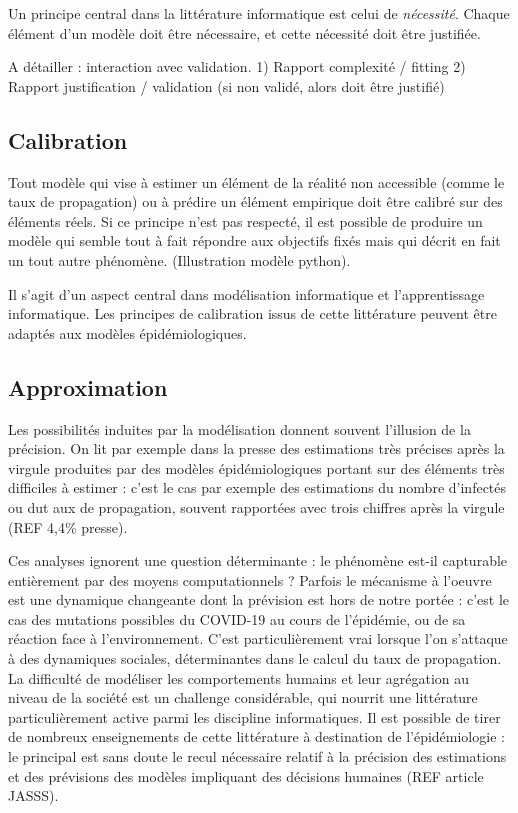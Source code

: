 \documentclass[review]{elsarticle}
\begin{document}
Un principe central dans la littérature informatique est celui de \textit{nécessité}. Chaque élément d'un modèle doit être nécessaire, et cette nécessité doit être justifiée.

A détailler : interaction avec validation. 
1) Rapport complexité / fitting
2) Rapport justification / validation  (si non validé, alors doit être justifié)

\subsection{Calibration}

Tout modèle qui vise à estimer un élément de la réalité non accessible (comme le taux de propagation) ou à prédire un élément empirique doit être calibré sur des éléments réels. Si ce principe n'est pas respecté, il est possible de produire un modèle qui semble tout à fait répondre aux objectifs fixés mais qui décrit en fait un tout autre phénomène. (Illustration modèle python).

Il s'agit d'un aspect central dans modélisation informatique et l'apprentissage informatique. Les principes de calibration issus de cette littérature peuvent être adaptés aux modèles épidémiologiques.

\subsection{Approximation}

Les possibilités induites par la modélisation donnent souvent l'illusion de la précision. On lit par exemple dans la presse des estimations très précises après la virgule produites par des modèles épidémiologiques portant sur des éléments très difficiles à estimer : c'est le cas par exemple des estimations du nombre d'infectés ou dut aux de propagation, souvent rapportées avec trois chiffres après la virgule (REF 4,4\% presse). 

Ces analyses ignorent une question déterminante : le phénomène est-il capturable entièrement par des moyens computationnels ? Parfois le mécanisme à l'oeuvre est une dynamique changeante dont la prévision est hors de notre portée : c'est le cas des mutations possibles du COVID-19 au cours de l'épidémie, ou de sa réaction face à l'environnement. C'est particulièrement vrai lorsque l'on s'attaque à des dynamiques sociales, déterminantes dans le calcul du taux de propagation. La difficulté de modéliser les comportements humains et leur agrégation au niveau de la société est un challenge considérable, qui nourrit une littérature particulièrement active parmi les discipline informatiques. Il est possible de tirer de nombreux enseignements de cette littérature à destination de l'épidémiologie : le principal est sans doute le recul nécessaire relatif à la précision des estimations et des prévisions des modèles impliquant des décisions humaines (REF article JASSS).
\end{document}
